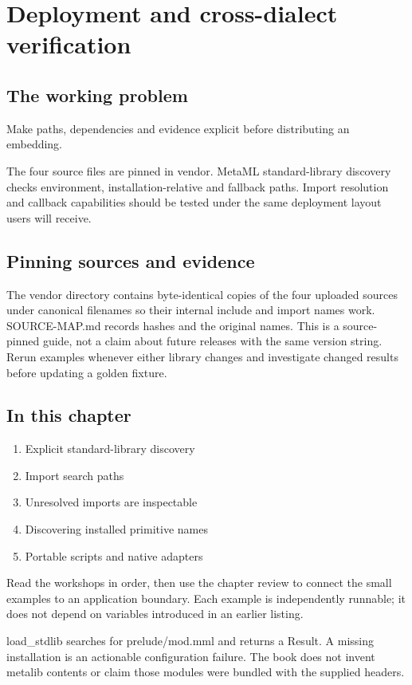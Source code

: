 \chapter{Deployment and cross-dialect verification}\label{ch:22}
\section*{The working problem}
Make paths, dependencies and evidence explicit before distributing an embedding.

The four source files are pinned in vendor. MetaML standard-library discovery checks environment, installation-relative and fallback paths. Import resolution and callback capabilities should be tested under the same deployment layout users will receive.

\section*{Pinning sources and evidence}
The vendor directory contains byte-identical copies of the four uploaded sources under canonical filenames so their internal include and import names work. SOURCE-MAP.md records hashes and the original names. This is a source-pinned guide, not a claim about future releases with the same version string. Rerun examples whenever either library changes and investigate changed results before updating a golden fixture.

\section*{In this chapter}
\begin{enumerate}
\item Explicit standard-library discovery
\item Import search paths
\item Unresolved imports are inspectable
\item Discovering installed primitive names
\item Portable scripts and native adapters
\end{enumerate}
Read the workshops in order, then use the chapter review to connect the small examples to an application boundary. Each example is independently runnable; it does not depend on variables introduced in an earlier listing.

\clearpage
{}
load\_stdlib searches for prelude/mod.mml and returns a Result. A missing installation is an actionable configuration failure. The book does not invent metalib contents or claim those modules were bundled with the supplied headers.

